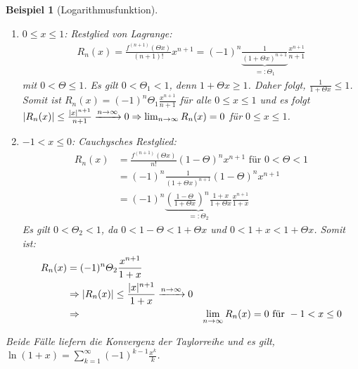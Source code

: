 \documentclass[ngerman,titlepage,twoside, parskip=half*]{scrreprt}
\theoremstyle{break}
\theoremstyle{nonumberbreak}
\newtheorem{beispiel}{Beispiel}
\DeclarePairedDelimiter{\abs}{\lvert}{\rvert}
\begin{document}
\begin{beispiel}[Logarithmusfunktion]
  \begin{enumerate}[1.\,F{a}ll]
  \item $0\leq x\leq 1$: Restglied von Lagrange:
    \begin{gather*}
      R_n(x)=\frac{f^{(n+1)}(\Theta x)}{(n+1)!}x^{n+1}=(-1)^n
      \underbrace{\frac{1}{(1+\Theta x)^{n+1}}}_{=\colon \Theta_1}
      \frac{x^{n+1}}{n+1}
    \end{gather*}
    mit $0<\Theta\leq 1$. Es gilt $0<\Theta_1<1$,
    denn $1+\Theta x\geq 1$. Daher folgt, $\frac{1}{1+\Theta x}\leq 1$.
    Somit ist $R_n(x)=(-1)^n\Theta_1\frac{x^{n+1}}{n+1}$ für alle
    $0\leq x\leq 1$ und es folgt $\abs{R_n(x)}\leq\frac{\abs{x}^{n+1}}{n+1}
    \xrightarrow{n\rightarrow\infty} 0\Rightarrow\lim_{n\rightarrow\infty}
    R_n(x)=0$ für $0\leq x \leq 1$.
  \item $-1<x\leq 0$: Cauchysches Restglied:
    \begin{align*}
      R_n(x)&= \frac{f^{(n+1)}(\Theta x)}{n!}(1-\Theta)^nx^{n+1}\text{ für }
      0<\Theta <1\\
      &= (-1)^n\frac{1}{(1+\Theta x)^{n+1}}(1-\Theta)^nx^{n+1}\\
      &= (-1)^n\underbrace{\left( \frac{1-\Theta}{1+\Theta x} \right)^n
      \frac{1+x}{1+\Theta x}}_{=\colon\Theta_2}\frac{x^{n+1}}{1+x}
    \end{align*}
    Es gilt $0<\Theta_{2}<1$, da $0<1-\Theta<1+\Theta x$ und $0<1+x<1+\Theta x$.
    Somit ist:
    \begin{align*}
      R_n(x) &= (-1)^n\Theta_2\frac{x^{n+1}}{1+x}\\
      &\Rightarrow
      \abs{R_n(x)}\leq\frac{\abs{x}^{n+1}}{1+x}\xrightarrow{n\rightarrow\infty}
      0\\
      &\Rightarrow& \lim_{n\rightarrow\infty} R_n(x)=0\text{ für }
      -1<x\leq 0
    \end{align*}
  \end{enumerate}
  Beide Fälle liefern die Konvergenz der Taylorreihe und es gilt, $\ln
  (1+x)= \sum_{k=1}^{\infty} (-1)^{k-1} \frac{x^{k}}{k}$.


\end{beispiel}
\end{document}
